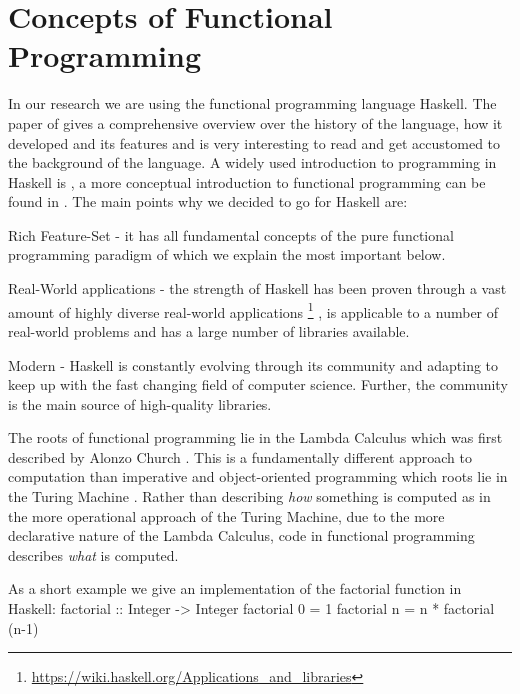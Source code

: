 \section{Concepts of Functional Programming}
In our research we are using the functional programming language Haskell. The paper of \citep{hudak_history_2007} gives a comprehensive overview over the history of the language, how it developed and its features and is very interesting to read and get accustomed to the background of the language. A widely used introduction to programming in Haskell is \citep{hutton_programming_2016}, a more conceptual introduction to functional programming can be found in \citep{maclennan_functional_1990}. The main points why we decided to go for Haskell are:

\begin{itemize*}
	\item Rich Feature-Set - it has all fundamental concepts of the pure functional programming paradigm of which we explain the most important below.
	\item Real-World applications - the strength of Haskell has been proven through a vast amount of highly diverse real-world applications \footnote{\url{https://wiki.haskell.org/Applications_and_libraries}} \cite{hudak_history_2007}, is applicable to a number of real-world problems \cite{osullivan_real_2008} and has a large number of libraries available.
	\item Modern - Haskell is constantly evolving through its community and adapting to keep up with the fast changing field of computer science. Further, the community is the main source of high-quality libraries.
\end{itemize*}

The roots of functional programming lie in the Lambda Calculus which was first described by Alonzo Church \citep{church_unsolvable_1936}. This is a fundamentally different approach to computation than imperative and object-oriented programming which roots lie in the Turing Machine \citep{turing_computable_1937}. Rather than describing \textit{how} something is computed as in the more operational approach of the Turing Machine, due to the more declarative nature of the Lambda Calculus, code in functional programming describes \textit{what} is computed.

As a short example we give an implementation of the factorial function in Haskell:
factorial :: Integer -> Integer
factorial 0 = 1
factorial n = n * factorial (n-1)

